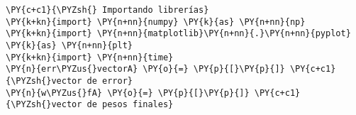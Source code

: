 \begin{tcolorbox}[breakable, size=fbox, boxrule=1pt, pad at break*=1mm,colback=cellbackground, colframe=cellborder]
\begin{Verbatim}[commandchars=\\\{\}]
\PY{c+c1}{\PYZsh{} Importando librerías}
\PY{k+kn}{import} \PY{n+nn}{numpy} \PY{k}{as} \PY{n+nn}{np}
\PY{k+kn}{import} \PY{n+nn}{matplotlib}\PY{n+nn}{.}\PY{n+nn}{pyplot} \PY{k}{as} \PY{n+nn}{plt}
\PY{k+kn}{import} \PY{n+nn}{time}
\PY{n}{err\PYZus{}vectorA} \PY{o}{=} \PY{p}{[}\PY{p}{]} \PY{c+c1}{\PYZsh{}vector de error}
\PY{n}{w\PYZus{}fA} \PY{o}{=} \PY{p}{[}\PY{p}{]} \PY{c+c1}{\PYZsh{}vector de pesos finales}
\end{Verbatim}
\end{tcolorbox}

